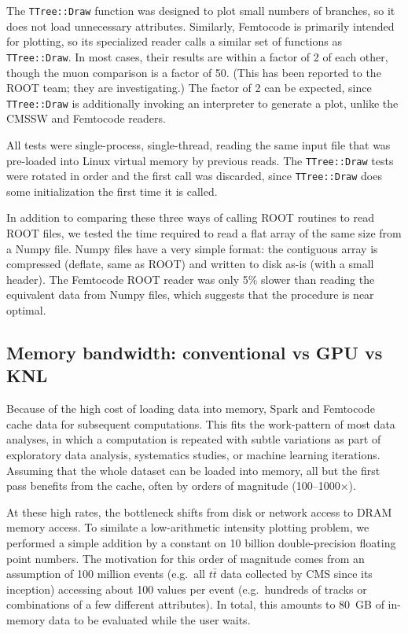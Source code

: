 \documentclass[12pt]{article}
\begin{document}
The {\tt TTree::Draw} function was designed to plot small numbers of branches, so it does not load unnecessary attributes. Similarly, Femtocode is primarily intended for plotting, so its specialized reader calls a similar set of functions as {\tt TTree::Draw}. In most cases, their results are within a factor of 2 of each other, though the muon comparison is a factor of 50. (This has been reported to the ROOT team; they are investigating.) The factor of 2 can be expected, since {\tt TTree::Draw} is additionally invoking an interpreter to generate a plot, unlike the CMSSW and Femtocode readers.

All tests were single-process, single-thread, reading the same input file that was pre-loaded into Linux virtual memory by previous reads. The {\tt TTree::Draw} tests were rotated in order and the first call was discarded, since {\tt TTree::Draw} does some initialization the first time it is called.

In addition to comparing these three ways of calling ROOT routines to read ROOT files, we tested the time required to read a flat array of the same size from a Numpy file. Numpy files have a very simple format: the contiguous array is compressed (deflate, same as ROOT) and written to disk as-is (with a small header). The Femtocode ROOT reader was only 5\% slower than reading the equivalent data from Numpy files, which suggests that the procedure is near optimal.

\subsection*{Memory bandwidth: conventional vs GPU vs KNL}

Because of the high cost of loading data into memory, Spark and Femtocode cache data for subsequent computations. This fits the work-pattern of most data analyses, in which a computation is repeated with subtle variations as part of exploratory data analysis, systematics studies, or machine learning iterations. Assuming that the whole dataset can be loaded into memory, all but the first pass benefits from the cache, often by orders of magnitude (100--1000$\times$).

At these high rates, the bottleneck shifts from disk or network access to DRAM memory access. To similate a low-arithmetic intensity plotting problem, we performed a simple addition by a constant on 10 billion double-precision floating point numbers. The motivation for this order of magnitude comes from an assumption of 100 million events (e.g.\ all $t\bar{t}$ data collected by CMS since its inception) accessing about 100 values per event (e.g.\ hundreds of tracks or combinations of a few different attributes). In total, this amounts to 80~GB of in-memory data to be evaluated while the user waits.
\end{document}

